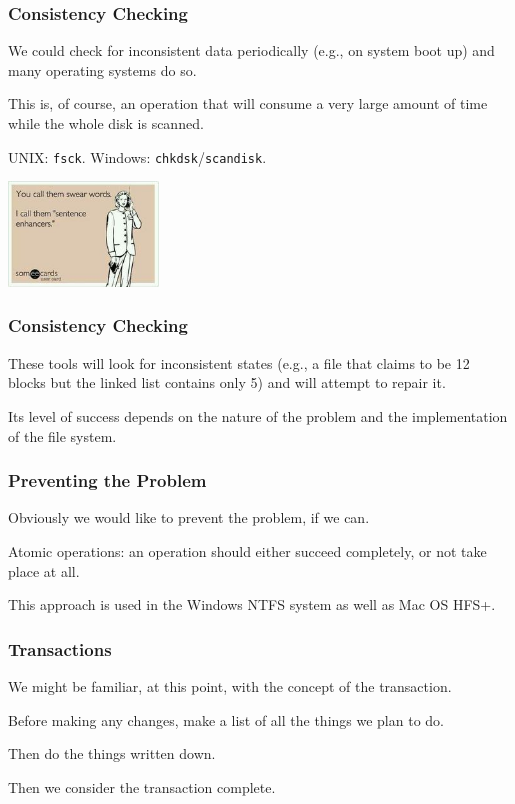 \begin{frame}
\frametitle{Consistency Checking}

We could check for inconsistent data periodically (e.g., on system boot up) and many operating systems do so. 

This is, of course, an operation that will consume a very large amount of time while the whole disk is scanned. 

UNIX: \texttt{fsck}. Windows: \texttt{chkdsk}/\texttt{scandisk}.

\begin{center}
	\includegraphics[width=0.3\textwidth]{images/swearwords.jpg}
\end{center}

\end{frame}

\begin{frame}
\frametitle{Consistency Checking}

These tools will look for inconsistent states (e.g., a file that claims to be 12 blocks but the linked list contains only 5) and will attempt to repair it.

Its level of success depends on the nature of the problem and the implementation of the file system.

\end{frame}



\begin{frame}
\frametitle{Preventing the Problem}

Obviously we would like to prevent the problem, if we can. 

Atomic operations: an operation should either succeed completely, or not take place at all. 

This approach is used in the Windows NTFS system as well as Mac OS HFS+.


\end{frame}

\begin{frame}
\frametitle{Transactions}

We might be familiar, at this point, with the concept of the \alert{transaction}.

Before making any changes, make a list of all the things we plan to do. 

Then do the things written down. 

Then we consider the transaction complete.

\end{frame}

